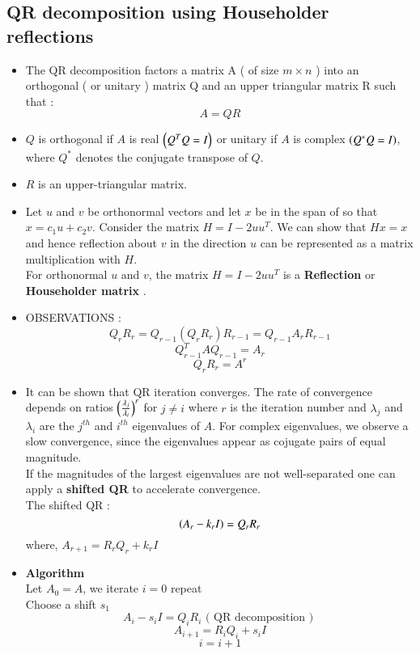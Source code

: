 \documentclass[article]{IEEEtran}
\numberwithin{equation}{enumi}
\numberwithin{figure}{enumi}
\begin{document}
		\subsection{QR decomposition using Householder reflections}
		\begin{itemize}
			\item The QR decomposition factors a matrix A ( of size $m \times n$ ) into an orthogonal ( or unitary ) matrix Q and an upper triangular matrix R such that :
				$$ A = QR $$
			\item $Q$ is orthogonal if $A$ is real $\left(Q^T Q = I\right)$ or unitary if $A$ is complex $\left(Q^{*} Q = I\right)$, where $Q^{*}$ denotes the conjugate transpose of $Q$.
			\item $R$ is an upper-triangular matrix.
			\item Let $u$ and $v$ be orthonormal vectors and let $x$ be in the span of  so that $x = c_1 u + c_2 v$. Consider the matrix $H = I - 2uu^T $. We can show that $Hx = x$ and hence reflection about $v$ in the direction $u$ can be represented as a matrix multiplication with $H$. \\
				For orthonormal $u$ and $v$, the matrix $H = I - 2uu^T $ is a \textbf{Reflection} or \textbf{Householder matrix} .
			\item OBSERVATIONS : \\
				$$ Q_r R_r = Q_{r-1} (Q_r R_r) R_{r-1} = Q_{r-1} A_r R_{r-1} $$
				$$ Q_{r-1}^T A Q_{r-1} = A_r $$
				$$ Q_r R_r = A^r $$
			\item It can be shown that QR iteration converges. The rate of convergence depends on ratios $\left(\frac{\lambda_j}{\lambda_i}\right)^r$ for $j \neq i$ where $r$ is the iteration number and $\lambda_j$ and $\lambda_i$ are the $j^{th}$ and $i^{th}$ eigenvalues of $A$. For complex eigenvalues, we observe a slow convergence, since the eigenvalues appear as cojugate pairs of equal magnitude. \\
				If the magnitudes of the largest eigenvalues are not well-separated one can apply a \textbf{shifted QR} to accelerate convergence. \\
				The shifted QR : 
				$$ \left(A_r - k_r I\right) = Q_r R_r $$
				where, $A_{r+1} = R_r Q_r + k_r I $
			\item \textbf{Algorithm} \\
				Let $A_0 = A$, we iterate $i=0$ repeat \\
					Choose a shift $s_1$
					$$ A_i - s_i I = Q_i R_i \text{ ( QR decomposition ) }$$
					$$ A_{i+1} = R_i Q_i + s_i I $$
					$$ i = i + 1 $$

\end{itemize}
\end{document}
